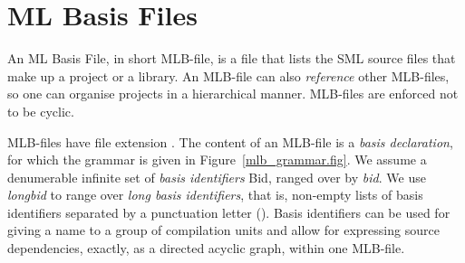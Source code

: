 \documentclass[12pt]{book}
\begin{document}
\section{ML Basis Files}
An ML Basis File, in short MLB-file,
%
%
%
%
is a file that lists the SML source files that make up a project or a
library. An MLB-file can also
%
%
%
\emph{reference} other MLB-files, so one can organise projects in a hierarchical
manner. MLB-files are enforced not to be cyclic.

MLB-files have file extension
%
%
%
.  The content of an MLB-file is a \emph{basis declaration}, for which
the
%
%
%
grammar is given in Figure~\ref{mlb_grammar.fig}. We assume a denumerable
infinite set of \emph{basis identifiers} Bid, ranged over by \emph{bid}. We use
\emph{longbid} to range over \emph{long basis identifiers}, that is, non-empty
lists of basis identifiers separated by a punctuation letter (). Basis
identifiers can be used for giving a name to a group of compilation units and
allow for expressing source dependencies, exactly, as a directed acyclic graph,
within one MLB-file.
\end{document}
